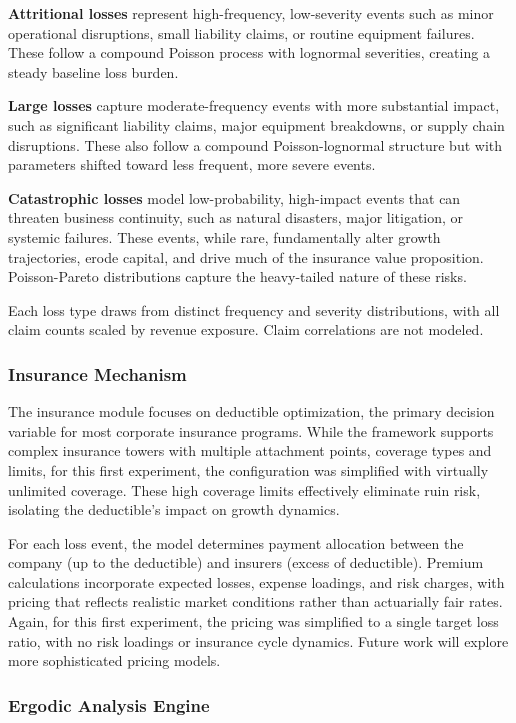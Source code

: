\documentclass[11pt,letterpaper]{article}
\begin{document}
\textbf{Attritional losses} represent high-frequency, low-severity events such as minor operational disruptions, small liability claims, or routine equipment failures. These follow a compound Poisson process with lognormal severities, creating a steady baseline loss burden.

\textbf{Large losses} capture moderate-frequency events with more substantial impact, such as significant liability claims, major equipment breakdowns, or supply chain disruptions. These also follow a compound Poisson-lognormal structure but with parameters shifted toward less frequent, more severe events.

\textbf{Catastrophic losses} model low-probability, high-impact events that can threaten business continuity, such as natural disasters, major litigation, or systemic failures. These events, while rare, fundamentally alter growth trajectories, erode capital, and drive much of the insurance value proposition. Poisson-Pareto distributions capture the heavy-tailed nature of these risks.

Each loss type draws from distinct frequency and severity distributions, with all claim counts scaled by revenue exposure. Claim correlations are not modeled.

\subsubsection{Insurance Mechanism}

The insurance module focuses on deductible optimization, the primary decision variable for most corporate insurance programs. While the framework supports complex insurance towers with multiple attachment points, coverage types and limits, for this first experiment, the configuration was simplified with virtually unlimited coverage. These high coverage limits effectively eliminate ruin risk, isolating the deductible's impact on growth dynamics.

For each loss event, the model determines payment allocation between the company (up to the deductible) and insurers (excess of deductible). Premium calculations incorporate expected losses, expense loadings, and risk charges, with pricing that reflects realistic market conditions rather than actuarially fair rates. Again, for this first experiment, the pricing was simplified to a single target loss ratio, with no risk loadings or insurance cycle dynamics. Future work will explore more sophisticated pricing models.

\subsubsection{Ergodic Analysis Engine}
\end{document}
